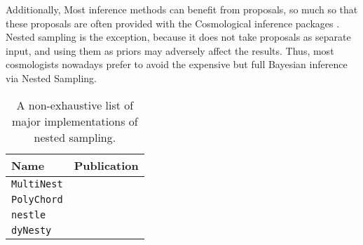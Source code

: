 \documentclass[draft,usenatbib]{mnras}
\begin{document}
Additionally, Most inference methods can benefit from proposals, so
much so that these proposals are often provided with the
Cosmological inference packages \citep{cobaya}. Nested sampling is
the exception, because it does not take proposals as separate input,
and using them as priors may adversely affect the results. Thus,
most cosmologists nowadays prefer to avoid the expensive but full
Bayesian inference via Nested Sampling.

 \begin{table}
  \centering
  \caption{A non-exhaustive list of major implementations of nested sampling.}
  \begin{tabular}{lr}
	  \textbf{Name} & \textbf{Publication}\\
      \hline
      \texttt{MultiNest} & \cite{Feroz2009MultiNestAE} \\
      \texttt{PolyChord} & \cite{polychord} \\
      \texttt{nestle} & \cite{nestle} \\
      \texttt{dyNesty} & \cite{Speagle_2020}
  \end{tabular}
\end{table}
\end{document}
